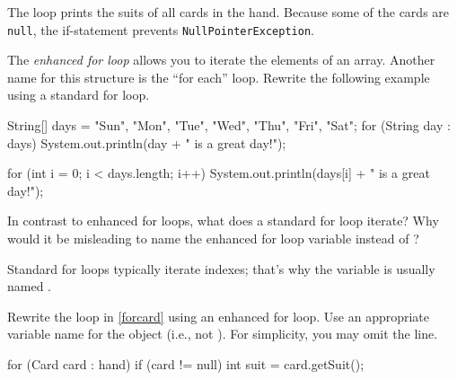 \begin{answer}[3em]
The loop prints the suits of all cards in the hand.
Because some of the cards are {\tt null}, the if-statement prevents {\tt NullPointerException}.
\end{answer}


\Q The \emph{enhanced for loop} allows you to iterate the elements of an array.
Another name for this structure is the ``for each'' loop.
Rewrite the following example using a standard for loop.

\vspace{1ex}
\begin{javalst}
String[] days = {"Sun", "Mon", "Tue", "Wed", "Thu", "Fri", "Sat"};
for (String day : days) {
    System.out.println(day + " is a great day!");
}
\end{javalst}
\vspace{-1em}

\begin{answer}
\begin{javaans}
for (int i = 0; i < days.length; i++) {
    System.out.println(days[i] + " is a great day!");
}
\end{javaans}
\end{answer}


\Q In contrast to enhanced for loops, what does a standard for loop iterate?
Why would it be misleading to name the enhanced for loop variable  instead of ?

\begin{answer}[2em]
Standard for loops typically iterate indexes; that's why the variable is usually named .
\end{answer}


\Q \label{foreach}
Rewrite the loop in \ref{forcard} using an enhanced for loop.
Use an appropriate variable name for the  object (i.e., not ).
For simplicity, you may omit the  line.

\begin{answer}[7em]
\begin{javaans}
for (Card card : hand) {
    if (card != null) {
        int suit = card.getSuit();
    }
}
\end{javaans}
\end{answer}
